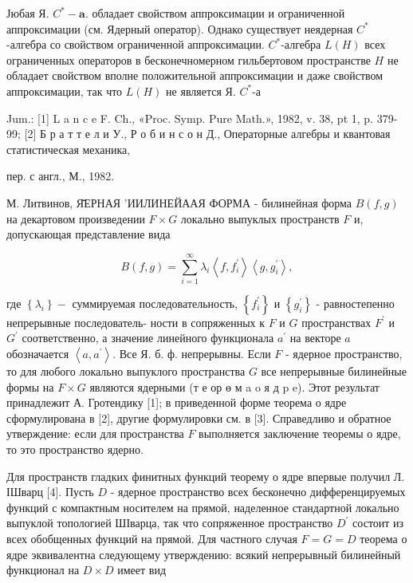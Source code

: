 \documentclass[10pt]{article}
\begin{document}
Јюбая Я. $C^{*}-\mathbf{a}$. обладает свойством аппроксимации и ограниченной аппроксимации (см. Ядерный оператор). Однако существует неядерная $C^{*}$-алгебра со свойством ограниченной аппроксимации. $C^{*}$-алгебра $L(H)$ всех ограниченных операторов в бесконечномерном гильбертовом пространстве $H$ не обладает свойством вполне положительной аппроксимации и даже свойством аппроксимации, так что $L(H)$ не является Я. $C^{*}$-а



Jum.: [1] L a n c e F. Ch., «Proc. Symp. Pure Math.», 1982, v. 38, pt 1, p. 379-99; [2] Б р а т т е л и У., Р о б и н с о н Д., Операторные алгебры и квантовая статистическая механика,

пер. с англ., М., 1982.

М. Литвинов, Я̆ЕРНАЯ 'ИИЛИНЕЙААЯ ФОРМА - билинейная форма $B(f, g)$ на декартовом произведении $F \times G$ локально выпуклых пространств $F$ и, допускающая представление вида



\[

B(f, g)=\sum_{i=1}^{\infty} \lambda_{i}\left\langle f, f_{i}^{\prime}\right\rangle\left\langle g, g_{i}^{\prime}\right\rangle,

\]



где $\left\{\lambda_{i}\right\}-$ суммируемая последовательность, $\left\{f_{i}^{\prime}\right\}$ и $\left\{g_{i}^{\prime}\right\}$ - равностепенно непрерывные последователь- ности в сопряженных к $F$ и $G$ пространствах $F^{\prime}$ и $G^{\prime}$ соответственно, а значение линейного функционала $a^{\prime}$ на векторе $a$ обозначается $\left\langle a, a^{\prime}\right\rangle$. Все Я. б. ф. непрерывны. Если $F$ - ядерное пространство, то для любого локально выпуклого пространства $G$ все непрерывные билинейные формы на $F \times G$ являются ядерными (т е ор ө м a o я д p e). Этот результат принадлежит А. Гротендику [1]; в приведенной форме теорема о ядре сформулирована в [2], другие формулировки см. в [3]. Справедливо и обратное утверждение: если для пространства $F$ выполняется заключение теоремы о ядре, то это пространство ядерно.



Для пространств гладких финитных функций теорему о ядре впервые получил Л. ІШварц [4]. Пусть $D$ - ядерное пространство всех бесконечно дифференцируемых функций с компактным носителем на прямой, наделенное стандартной локально выпуклой топологией ШІварца, так что сопряженное пространство $D^{\prime}$ состоит из всех обобщенных функций на прямой. Для частного случая $F=G=D$ теорема о ядре эквивалентна следующему утверждению: всякий непрерывный билинейный функционал на $D \times D$ имеет вид
\end{document}
